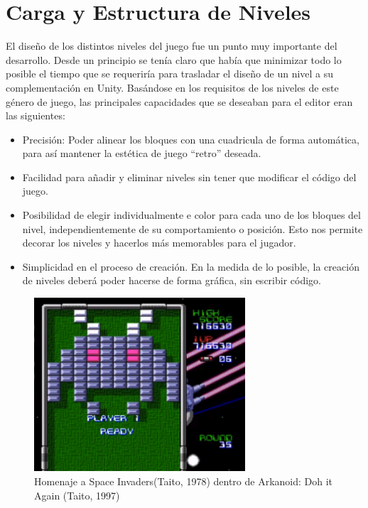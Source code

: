 \clearpage 
\section{Carga y Estructura de Niveles}
El diseño de los distintos niveles del juego fue un punto muy importante del desarrollo. Desde un principio se tenía claro que había que minimizar todo lo posible el tiempo que se requeriría para trasladar el diseño de un nivel a su complementación en Unity. Basándose en los requisitos de los niveles de este género de juego, las principales capacidades que se deseaban para el editor eran las siguientes:

\begin{itemize}
  \item Precisión: Poder alinear los bloques con una cuadricula de forma automática, para así mantener la estética de juego ``retro'' deseada.
  \item Facilidad para añadir y eliminar niveles sin tener que modificar el código del juego. 
  \item Posibilidad de elegir individualmente e color para cada uno de los bloques del nivel, independientemente de su comportamiento o posición. Esto nos permite decorar los niveles y hacerlos más memorables para el jugador. 
  \item Simplicidad en el proceso de creación. En la medida de lo posible, la creación de niveles deberá poder hacerse de forma gráfica, sin escribir código.
\end{itemize}

\begin{figure}[h]
	\includegraphics[width=0.7\textwidth]{images/estructura/niveles/ejemplo-arkanoid}
	\centering
	\caption{Homenaje a Space Invaders(Taito, 1978) dentro de Arkanoid: Doh it Again (Taito, 1997)}
\end{figure}

